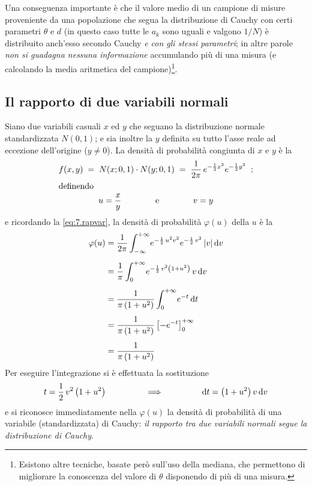 Una conseguenza importante \`e che il valore medio di un
campione di misure proveniente da una popolazione che segua
la distribuzione di Cauchy con certi parametri $\theta$ e
$d$ (in questo caso tutte le $a_k$ sono uguali e valgono
$1/N$) \`e distribuito anch'esso secondo Cauchy \emph{e con
  gli stessi parametri}; in altre parole \emph{non si
  guadagna nessuna informazione} accumulando pi\`u di una
misura (e calcolando la media aritmetica del
campione)\/\footnote{Esistono altre tecniche, basate per\`o
  sull'uso della mediana, che permettono di migliorare la
  conoscenza del valore di $\theta$ disponendo di pi\`u
  di una misura.}.%

\subsection{Il rapporto di due variabili normali}%
Siano due variabili casuali $x$ ed $y$ che seguano la
distribuzione normale standardizzata $N(0,1)$; e sia inoltre
la $y$ definita su tutto l'asse reale ad eccezione
dell'origine ($y \ne 0$).  La densit\`a di probabilit\`a
congiunta di $x$ e $y$ \`e la
\begin{gather*}
  f(x,y) \; = \; N(x; 0, 1) \cdot N(y; 0, 1) \; = \;
  \frac{1}{2 \pi} \, e^{- \frac{1}{2} x^2 } e^{ -
    \frac{1}{2} y^2 } \peq ; \\
  \intertext{definendo}
  u = \frac{x}{y} \makebox[30mm]{e} v = y
\end{gather*}
e ricordando la \eqref{eq:7.rapvar}, la densit\`a di
probabilit\`a $\varphi(u)$ della $u$ \`e la
\begin{align*}
  \varphi(u) &= \frac{1}{2 \pi} \int_{-\infty}^{+\infty} \!
  e^{- \frac{1}{2} \, u^2 v^2} e^{- \frac{1}{2} \, v^2} \,
  |v| \, \mathrm{d} v \\[1ex]
  &= \frac{1}{\pi} \int_0^{+\infty} \! e^{- \frac{1}{2} \,
    v^2 \left( 1 + u^2 \right) } \, v \, \mathrm{d} v \\[1ex]
  &= \frac{1}{\pi \left( 1 + u^2 \right)} \int_0^{+\infty}
  \! e^{-t} \, \mathrm{d} t \\[1ex]
  &= \frac{1}{\pi \left( 1 + u^2 \right)} \left[ - e^{-t}
  \right]_0^{+\infty} \\[1ex]
  &= \frac{1}{\pi \left( 1 + u^2 \right)}
\end{align*}
Per eseguire l'integrazione si \`e effettuata la
sostituzione
\begin{equation*}
  t = \frac{1}{2} \, v^2 \left( 1 + u^2 \right)
  \makebox[40mm]{$\Longrightarrow$}
  \de t = \left( 1 + u^2 \right) v \, \de v
\end{equation*}
e si riconosce immediatamente nella $\varphi(u)$ la
densit\`a di probabilit\`a di una variabile (standardizzata)
di Cauchy: \emph{il rapporto tra due variabili normali segue
  la distribuzione di Cauchy}.%


